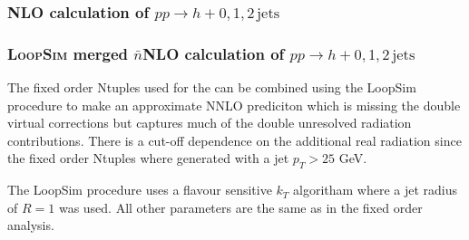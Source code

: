 \subsubsection{NLO calculation of $pp\to h+0,1,2\,\text{jets}$}
\label{sec:hjetscomp:tools:fo:hnj}

\subsubsection{\textsc{LoopSim} merged $\bar{n}$NLO calculation of $pp\to h+0,1,2\,\text{jets}$}
\label{sec:hjetscomp:tools:fo:hnjloopsim}

The fixed order Ntuples used for the can be combined using the LoopSim procedure to make
an approximate NNLO prediciton which is missing the double virtual corrections but captures
much of the double unresolved radiation contributions. There is a cut-off dependence on the
additional real radiation since the fixed order Ntuples where generated with a jet $p_T>25$ GeV.

The LoopSim procedure uses a flavour sensitive $k_T$ algoritham where a jet radius of $R=1$ was used.
All other parameters are the same as in the fixed order analysis.

